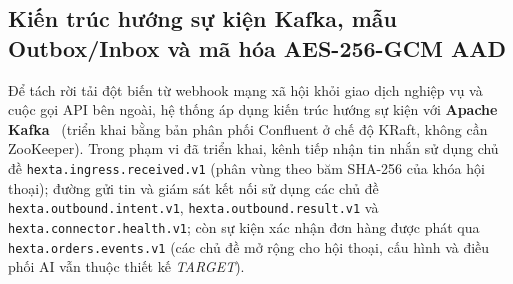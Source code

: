 \subsection{Kiến trúc hướng sự kiện Kafka, mẫu Outbox/Inbox và mã hóa AES-256-GCM AAD}
Để tách rời tải đột biến từ webhook mạng xã hội khỏi giao dịch nghiệp vụ và cuộc gọi API bên ngoài, hệ thống áp dụng kiến trúc hướng sự kiện với \textbf{Apache Kafka}~\cite{kreps2011kafka,kafkadocs} (triển khai bằng bản phân phối Confluent ở chế độ KRaft, không cần ZooKeeper). Trong phạm vi đã triển khai, kênh tiếp nhận tin nhắn sử dụng chủ đề \texttt{hexta.\hspace{0pt}ingress.\hspace{0pt}received.\hspace{0pt}v1} (phân vùng theo băm SHA-256
của khóa hội thoại); đường gửi tin và giám sát kết nối sử dụng các chủ đề \texttt{hexta.\hspace{0pt}outbound.\hspace{0pt}intent.\hspace{0pt}v1}, \texttt{hexta.\hspace{0pt}outbound.\hspace{0pt}result.\hspace{0pt}v1} và
\texttt{hexta.\hspace{0pt}connector.\hspace{0pt}health.\hspace{0pt}v1}; còn sự kiện xác nhận đơn hàng được phát qua \texttt{hexta.\hspace{0pt}orders.\hspace{0pt}events.\hspace{0pt}v1} (các chủ đề mở rộng cho hội thoại, cấu hình và điều phối AI vẫn thuộc thiết kế \emph{TARGET}).

